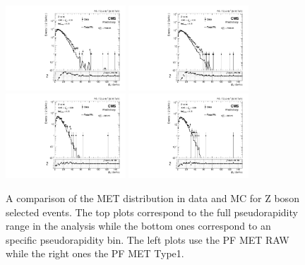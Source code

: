 \begin{figure}[h!]
\begin{center}
\includegraphics[width=0.4\textwidth]{Figures/WBoson/Analysis/Correction/Recoil/CheckFits/Z/METPF_RAW/PLOT_MET_DATA_ZToMuMi_PA_Model_TEMP_DY_MuEtaCM_m286_193_MuIso_0_15.pdf}
\includegraphics[width=0.4\textwidth]{Figures/WBoson/Analysis/Correction/Recoil/CheckFits/Z/METPF_Type1/PLOT_MET_DATA_ZToMuMi_PA_Model_TEMP_DY_MuEtaCM_m286_193_MuIso_0_15.pdf} \\
\includegraphics[width=0.4\textwidth]{Figures/WBoson/Analysis/Correction/Recoil/CheckFits/Z/METPF_RAW/PLOT_MET_DATA_ZToMuMi_PA_Model_TEMP_DY_MuEtaCM_m40_m20_MuIso_0_15.pdf}
\includegraphics[width=0.4\textwidth]{Figures/WBoson/Analysis/Correction/Recoil/CheckFits/Z/METPF_Type1/PLOT_MET_DATA_ZToMuMi_PA_Model_TEMP_DY_MuEtaCM_m40_m20_MuIso_0_15.pdf}
\caption{A comparison of the MET distribution in data and MC for Z boson selected events. The top plots correspond to the full pseudorapidity range in the analysis while the bottom ones correspond to an specific pseudorapidity bin. The left plots use the PF MET RAW while the right ones the PF MET Type1.}
\label{fig:METtypeCheck}
\end{center}
\end{figure}

